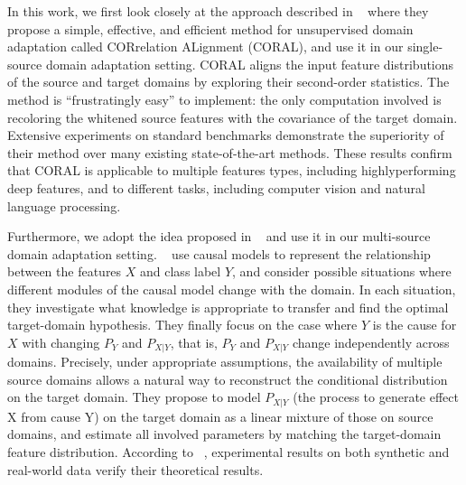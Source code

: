 In this work, we first look closely at the approach described in ~\citep{coral} where they propose a simple, effective, and efficient method for unsupervised domain adaptation called CORrelation ALignment (CORAL), and use it in our single-source domain adaptation setting. CORAL aligns the input feature distributions of the source and target domains by exploring their second-order statistics. The method is “frustratingly easy” to implement: the only computation involved is recoloring the whitened source features with the covariance of the target domain. Extensive experiments on standard benchmarks demonstrate the superiority of their method over many existing state-of-the-art methods. These results confirm that CORAL is applicable to multiple features types, including highlyperforming deep features, and to different tasks, including computer vision and natural language processing.

Furthermore, we adopt the idea proposed in ~\citep{mda} and use it in our multi-source domain adaptation setting. ~\citep{mda} use causal models to represent the relationship between the features $X$ and class label $Y$, and consider possible situations where different modules of the causal model change with the domain. In each situation, they investigate what knowledge is appropriate to transfer and find the optimal target-domain hypothesis. They finally focus on the case where $Y$ is the cause for $X$ with changing $P_Y$ and $P_{X|Y}$, that is, $P_Y$ and $P_{X|Y}$ change independently across domains. Precisely, under appropriate assumptions, the availability of multiple source domains allows a natural way to reconstruct the conditional distribution on the target domain. They propose to model $P_{X|Y}$ (the process to generate effect X from cause Y) on the target domain as a linear mixture of those on source domains, and estimate all involved parameters by matching the target-domain feature distribution. According to ~\citep{mda}, experimental results on both synthetic and real-world data verify their theoretical results.











